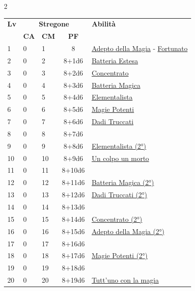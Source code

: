 {\begin{multicols}{2}


\noindent\begin{tabularx}{\linewidth}{p{0.55cm}|p{0.55cm}p{0.55cm}c|X|}
	\toprule
 \rowcolor{gray!20}	\textbf{Lv} & \multicolumn{3}{c|}{\textbf{Stregone}} & \textbf{Abilità} \\
& \centering\arraybackslash \textbf{CA} & \centering\arraybackslash \textbf{CM} & \centering\arraybackslash \textbf{PF} & \\
	\toprule
	1 & 0 & 1 & 8 & \hyperlink{Adepto della Magia}{Adepto della Magia} - \hyperlink{Fortunato}{Fortunato}\\
	\rowcolor{gray!20}2 & 0 & 2 & 8+1d6 & \hyperlink{Batteria Estesa}{Batteria Estesa}\\
	3 & 0 & 3 & 8+2d6 & \hyperlink{Concentrato}{Concentrato}\\
	\rowcolor{gray!20}4 & 0 & 4 & 8+3d6 & \hyperlink{Batteria Magica}{Batteria Magica}\\
	5 & 0 & 5 & 8+4d6 & \hyperlink{Elementalista}{Elementalista}\\
	\rowcolor{gray!20}6 & 0 & 6 & 8+5d6 & \hyperlink{Magie Potenti}{Magie Potenti}\\
	7 & 0 & 7 & 8+6d6 & \hyperlink{Dadi Truccati}{Dadi Truccati}\\
	\rowcolor{gray!20}8 & 0 & 8 & 8+7d6 & \\
	9 & 0 & 9 & 8+8d6 & \hyperlink{Elementalista}{Elementalista (2°)}\\
	\rowcolor{gray!20}10 & 0 & 10 & 8+9d6 & \hyperlink{Un colpo un morto}{Un colpo un morto}\\
	11 & 0 & 11 & 8+10d6 & \\
	\rowcolor{gray!20}12 & 0 & 12 & 8+11d6 & \hyperlink{Batteria Magica}{Batteria Magica (2°)}\\
	13 & 0 & 13 & 8+12d6 & \hyperlink{Dadi Truccati}{Dadi Truccati (2°)}\\
	\rowcolor{gray!20}14 & 0 & 14 & 8+13d6 & \\
	15 & 0 & 15 & 8+14d6 & \hyperlink{Concentrato}{Concentrato (2°)}\\
	\rowcolor{gray!20}16 & 0 & 16 & 8+15d6 & \hyperlink{Adepto della Magia}{Adepto della Magia (2°)}\\
	17 & 0 & 17 & 8+16d6 & \\
	\rowcolor{gray!20}18 & 0 & 18 & 8+17d6 & \hyperlink{Magie Potenti}{Magie Potenti (2°)}\\
	19 & 0 & 19 & 8+18d6 & \\
	\rowcolor{gray!20}20 & 0 & 20 & 8+19d6 & \hyperlink{Tutt'uno con la magia}{Tutt'uno con la magia}\\
\end{tabularx}


\end{multicols}}
